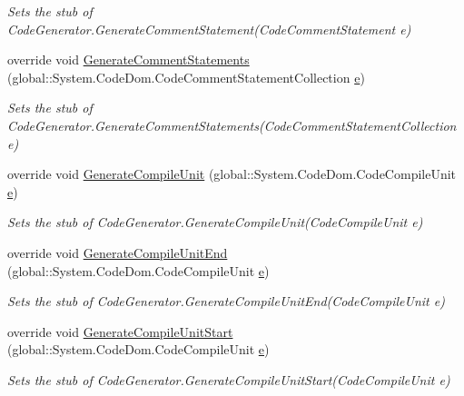 \begin{DoxyCompactItemize}
\begin{DoxyCompactList}\small\item\em Sets the stub of Code\-Generator.\-Generate\-Comment\-Statement(\-Code\-Comment\-Statement e)\end{DoxyCompactList}\item 
override void \hyperlink{class_system_1_1_code_dom_1_1_compiler_1_1_fakes_1_1_stub_code_compiler_aedd035547b2252ffa1758e8b38215c9f}{Generate\-Comment\-Statements} (global\-::\-System.\-Code\-Dom.\-Code\-Comment\-Statement\-Collection \hyperlink{jquery-1_810_82_8min_8js_a2c038346d47955cbe2cb91e338edd7e1}{e})
\begin{DoxyCompactList}\small\item\em Sets the stub of Code\-Generator.\-Generate\-Comment\-Statements(\-Code\-Comment\-Statement\-Collection e)\end{DoxyCompactList}\item 
override void \hyperlink{class_system_1_1_code_dom_1_1_compiler_1_1_fakes_1_1_stub_code_compiler_a629b8240fcad409853f0ec276c32300d}{Generate\-Compile\-Unit} (global\-::\-System.\-Code\-Dom.\-Code\-Compile\-Unit \hyperlink{jquery-1_810_82_8min_8js_a2c038346d47955cbe2cb91e338edd7e1}{e})
\begin{DoxyCompactList}\small\item\em Sets the stub of Code\-Generator.\-Generate\-Compile\-Unit(\-Code\-Compile\-Unit e)\end{DoxyCompactList}\item 
override void \hyperlink{class_system_1_1_code_dom_1_1_compiler_1_1_fakes_1_1_stub_code_compiler_a3dd8eff3d516cadf8f7054b6dc0e0ce0}{Generate\-Compile\-Unit\-End} (global\-::\-System.\-Code\-Dom.\-Code\-Compile\-Unit \hyperlink{jquery-1_810_82_8min_8js_a2c038346d47955cbe2cb91e338edd7e1}{e})
\begin{DoxyCompactList}\small\item\em Sets the stub of Code\-Generator.\-Generate\-Compile\-Unit\-End(\-Code\-Compile\-Unit e)\end{DoxyCompactList}\item 
override void \hyperlink{class_system_1_1_code_dom_1_1_compiler_1_1_fakes_1_1_stub_code_compiler_ab44f87216b50298d2532bb33ca5b00e9}{Generate\-Compile\-Unit\-Start} (global\-::\-System.\-Code\-Dom.\-Code\-Compile\-Unit \hyperlink{jquery-1_810_82_8min_8js_a2c038346d47955cbe2cb91e338edd7e1}{e})
\begin{DoxyCompactList}\small\item\em Sets the stub of Code\-Generator.\-Generate\-Compile\-Unit\-Start(\-Code\-Compile\-Unit e)\end{DoxyCompactList}\item 

\end{DoxyCompactItemize}
